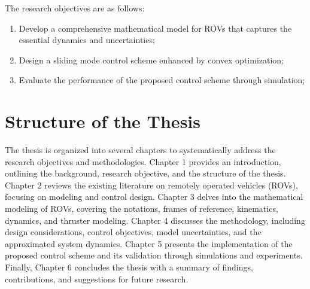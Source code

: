     The research objectives are as follows:
    \begin{enumerate}
        \item Develop a comprehensive mathematical model for ROVs that captures the essential dynamics and uncertainties;
        \item Design a sliding mode control scheme enhanced by convex optimization;
        \item Evaluate the performance of the proposed control scheme through simulation;
    \end{enumerate}

\section{Structure of the Thesis}
    The thesis is organized into several chapters to systematically address the research objectives and methodologies. Chapter 1 provides an introduction, outlining the background, research objective, and the structure of the thesis. Chapter 2 reviews the existing literature on remotely operated vehicles (ROVs), focusing on modeling and control design. Chapter 3 delves into the mathematical modeling of ROVs, covering the notations, frames of reference, kinematics, dynamics, and thruster modeling. Chapter 4 discusses the methodology, including design considerations, control objectives, model uncertainties, and the approximated system dynamics. Chapter 5 presents the implementation of the proposed control scheme and its validation through simulations and experiments. Finally, Chapter 6 concludes the thesis with a summary of findings, contributions, and suggestions for future research.
